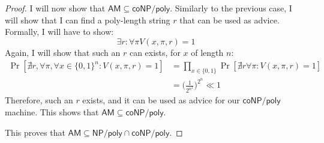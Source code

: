 \documentclass[letterpaper,11pt]{article}
\newcommand{\cc}[1]{\ensuremath{\textsf{#1}}\xspace}
\newcommand{\NP}{\cc{NP}}
\newcommand{\coNP}{\cc{coNP}}
\newcommand{\AM}{\cc{AM}}
\newcommand{\NPpoly}{\NP/\textsf{poly}}
\newcommand{\coNPpoly}{\coNP/\textsf{poly}}
\begin{document}
\begin{proof}
I will now show that $\AM \subseteq \coNPpoly$.
Similarly to the previous case, I will show that I can find a poly-length string $r$ that can be used as advice.
Formally, I will have to show:
\[
	\exists r : \forall \pi V(x,\pi,r) = 1
\]
Again, I will show that such an $r$ can exists, for $x$ of length $n$:
\begin{align*}
	\Pr[\nexists r, \forall \pi, \forall x \in \{0,1\}^n : V(x,\pi,r) = 1] &= \prod_{x \in \{0,1\}} \Pr[\nexists r \forall \pi : V(x,\pi,r) = 1] \\
	&= \Big(\frac{1}{2^{n^2}}\Big)^{2^n} \ll 1
\end{align*}
Therefore, such an $r$ exists, and it can be used as advice for our $\coNPpoly$ machine.
This shows that $\AM \subseteq \coNPpoly$.

This proves that $\AM \subseteq \NPpoly \cap \coNPpoly$.
\end{proof}
\end{document}
